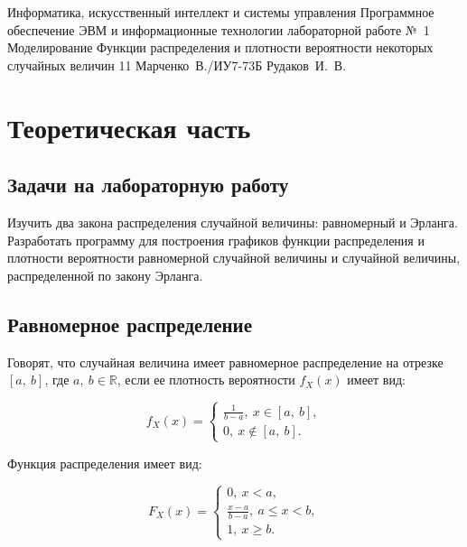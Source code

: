 \documentclass{bmstu}
\begin{document}
\makereporttitle
    {Информатика, искусственный интеллект и системы управления} %
    {Программное обеспечение ЭВМ и информационные технологии} %
    {лабораторной работе №~1} %
    {Моделирование} %
    {Функции распределения и плотности вероятности некоторых случайных величин} %
    {11} %
    {Марченко~В./ИУ7-73Б} %
    {Рудаков~И.~В.} %

{\centering \maketableofcontents}

\chapter{Теоретическая часть}

\section{Задачи на лабораторную работу}

Изучить два закона распределения случайной величины: равномерный и Эрланга. 
Разработать программу для построения графиков функции распределения и плотности вероятности равномерной случайной величины и случайной величины, распределенной по закону Эрланга.

\section{Равномерное распределение}

Говорят, что случайная величина имеет равномерное распределение на отрезке $[a,~b]$, где $a,~b \in \mathbb{R}$, если ее плотность вероятности $f_{X}(x)$ имеет вид:

\begin{equation}
f_{X}(x) = \begin{cases}
	\frac{1}{b - a},~x \in [a,~b], \\
	0,~x \notin [a,~b].
	\end{cases}
\end{equation}

Функция распределения имеет вид:

\begin{equation}
F_{X}(x) = \begin{cases}
	0,~x < a, \\
	\frac{x - a}{b - a},~a \leq x < b, \\
	1,~x \geq b.
	\end{cases}
\end{equation}
\end{document}

